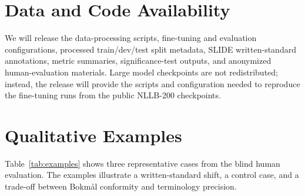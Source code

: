 \documentclass[11pt]{article}
\newcommand{\nb}{Bokm{\aa}l}
\begin{document}
\section*{Data and Code Availability}

We will release the data-processing scripts, fine-tuning and evaluation configurations, processed train/dev/test split metadata, SLIDE written-standard annotations, metric summaries, significance-test outputs, and anonymized human-evaluation materials. Large model checkpoints are not redistributed; instead, the release will provide the scripts and configuration needed to reproduce the fine-tuning runs from the public NLLB-200 checkpoints.





\appendix

\section{Qualitative Examples}
\label{app:qualitative-examples}

Table~\ref{tab:examples} shows three representative cases from the blind human evaluation. The examples illustrate a written-standard shift, a control case, and a trade-off between \nb{} conformity and terminology precision.
\end{document}

